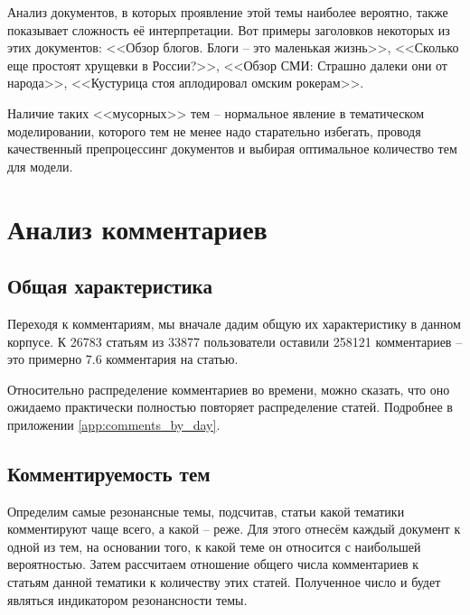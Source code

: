 Анализ документов, в которых проявление этой темы наиболее вероятно, также показывает сложность её интерпретации. Вот примеры заголовков некоторых из этих документов: <<Обзор блогов. Блоги – это маленькая жизнь>>, <<Сколько еще простоят хрущевки в России?>>, <<Обзор СМИ: Страшно далеки они от народа>>, <<Кустурица стоя аплодировал омским рокерам>>.

Наличие таких <<мусорных>> тем -- нормальное явление в тематическом моделировании, которого тем не менее надо старательно избегать, проводя качественный препроцессинг документов и выбирая оптимальное количество тем для модели.

\section{Анализ комментариев}
\subsection{Общая характеристика}
Переходя к комментариям, мы вначале дадим общую их характеристику в данном корпусе. К 26783 статьям  из 33877 пользователи оставили 258121 комментариев -- это примерно 7.6 комментария на статью.

Относительно распределение комментариев во времени, можно сказать, что оно ожидаемо практически полностью повторяет распределение статей. Подробнее в приложении \ref{app:comments_by_day}.

\subsection{Комментируемость тем}
Определим самые резонансные темы, подсчитав, статьи какой тематики комментируют чаще всего, а какой -- реже. Для этого отнесём каждый документ к одной из тем, на основании  того, к какой теме он относится с наибольшей вероятностью. Затем рассчитаем отношение общего числа комментариев к статьям данной тематики к количеству этих статей. Полученное число и будет являться индикатором резонансности темы.

